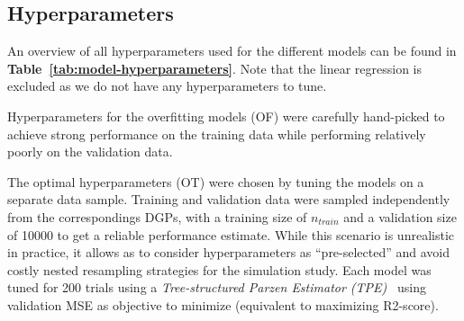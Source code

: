 \documentclass[runningheads]{llncs}
\begin{document}
\subsection{Hyperparameters}

An overview of all hyperparameters used for the different models can be found
in \textbf{Table~\ref{tab:model-hyperparameters}}. Note that the linear
regression is excluded as we do not have any hyperparameters to tune.

Hyperparameters for the overfitting models (OF) were carefully hand-picked to
achieve strong performance on the training data while performing relatively
poorly on the validation data.

The optimal hyperparameters (OT) were chosen by tuning the models on a separate
data sample. Training and validation data were sampled independently from the
correspondings DGPs, with a training size of $n_{train}$ and a validation size
of 10000 to get a reliable performance estimate. While this scenario is
unrealistic in practice, it allows as to consider hyperparameters as
``pre-selected'' and avoid costly nested resampling strategies for the
simulation study. Each model was tuned for 200 trials using a
\textit{Tree-structured Parzen Estimator (TPE)}~\cite{bergstra2011algorithms}
using validation MSE as objective to minimize (equivalent to maximizing
R2-score).
\end{document}
